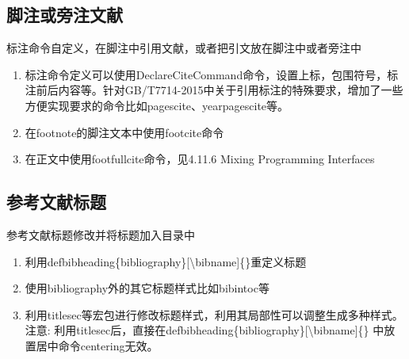 \begin{enumerate}
\begin{texlist}
\end{texlist}

\end{enumerate}


\subsection{脚注或旁注文献}
  标注命令自定义，在脚注中引用文献，或者把引文放在脚注中或者旁注中
  \begin{enumerate}
    \item 标注命令定义可以使用DeclareCiteCommand命令，设置上标，包围符号，标注前后内容等。针对GB/T7714-2015中关于引用标注的特殊要求，增加了一些方便实现要求的命令比如pagescite、yearpagescite等。
    \item 在footnote的脚注文本中使用footcite命令
    \item 在正文中使用footfullcite命令，见4.11.6 Mixing Programming Interfaces
  \end{enumerate}

\subsection{参考文献标题}
  参考文献标题修改并将标题加入目录中
  \begin{enumerate}
    \item 利用defbibheading\{bibliography\}[\textbackslash bibname]\{\}重定义标题
    \item 使用bibliography外的其它标题样式比如bibintoc等
    \item 利用titlesec等宏包进行修改标题样式，利用其局部性可以调整生成多种样式。注意: 利用titlesec后，直接在defbibheading\{bibliography\}[\textbackslash bibname]\{\} 中放置居中命令centering无效。
  \end{enumerate}


